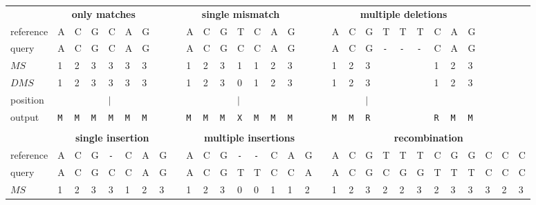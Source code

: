 \begin{tabular}{p{1.2cm} *{29}{p{.09cm}}}
\setlength{\extrarowheight}{-2pt} %
 & \multicolumn{6}{c}{\textbf{only matches}} &  &  & \multicolumn{7}{c}{\textbf{single mismatch}} &  &  &  \multicolumn{9}{c}{\textbf{multiple deletions}} & \\
reference & {\sf A} & {\sf C} & {\sf G} & {\sf C} & {\sf A} & {\sf G}  &  &  & {\sf A} & {\sf C} & {\sf G} & {\sf T} & {\sf C} & {\sf A} & {\sf G}  &  &  & {\sf A} & {\sf C} & {\sf G} & {\sf T} & {\sf T} & {\sf T} & {\sf C} & {\sf A} & {\sf G} &  &  \\
query & {\sf A} & {\sf C} & {\sf G} & {\sf C} & {\sf A} & {\sf G}  &  &  & {\sf A} & {\sf C} & {\sf G} & {\sf C} & {\sf C} & {\sf A} & {\sf G}  &  &  & {\sf A} & {\sf C} & {\sf G} & {\tt -} & {\tt -} & {\tt -} & {\sf C} & {\sf A} & {\sf G} &  &  \\
$MS$ & 1 & 2 & 3 & 3 & 3 & 3 &   &  & 1 & 2 & 3 & 1 & 1 & 2 & 3 & & & 1 & 2 & 3 &  & &  & 1 & 2 & 3 &  &  &  \\
$DMS$ & 1 & 2 & 3 & 3 & 3 & 3 & & & 1 & 2 & 3 & 0 & 1 & 2 & 3 & & & 1 & 2 & 3 & & & & 1 & 2 & 3 &  &  &  \\
position &  &  &  & $|$ &  &  &  &  & & &  & $|$ &  &  &  &  & & &  & $|$ &  &  &  &  &  &  &  &  &  \\
output & {\tt M} & {\tt M} & {\tt M} & {\tt M} & {\tt M} & {\tt M} & & & {\tt M} & {\tt M} & {\tt M} & {\tt X} & {\tt M} & {\tt M} & {\tt M} & & & {\tt M} & {\tt M} & {\tt R}  & &  &  & {\tt R} & {\tt M} & {\tt M} &  &  &  \\
 \\
 & \multicolumn{7}{c}{\textbf{single insertion}} &  & \multicolumn{8}{c}{\textbf{multiple insertions}} &  & \multicolumn{12}{c}{\textbf{recombination}} \\
reference & {\sf A} & {\sf C} & {\sf G} & {\tt -} & {\sf C} & {\sf A} & {\sf G} &  & {\sf A} & {\sf C} & {\sf G} & {\tt -} & {\tt -} & {\sf C} & {\sf A} & {\sf G} &  & {\sf A} & {\sf C} & {\sf G} & {\sf T} & {\sf T} & {\sf T} & {\sf C} & {\sf G} & {\sf G} & {\sf C} & {\sf C} & {\sf C} \\
query & {\sf A} & {\sf C} & {\sf G} & {\sf C} & {\sf C} & {\sf A} & {\sf G} &  & {\sf A} & {\sf C} & {\sf G} & {\sf T} & {\sf T} & {\sf C} & {\sf C} & {\sf A} &  & {\sf A} & {\sf C} & {\sf G} & {\sf C} & {\sf G} & {\sf G} & {\sf T} & {\sf T} & {\sf T} & {\sf C} & {\sf C} & {\sf C} \\
$MS$ & 1 & 2 & 3 & 3 & 1 & 2 & 3 &  & 1 & 2 & 3 & 0 & 0 & 1 & 1 & 2  &  & 1 & 2 & 3 & 2 & 2 & 3 & 2 & 3 & 3 & 3 & 2 & 3 \\

\end{tabular}
